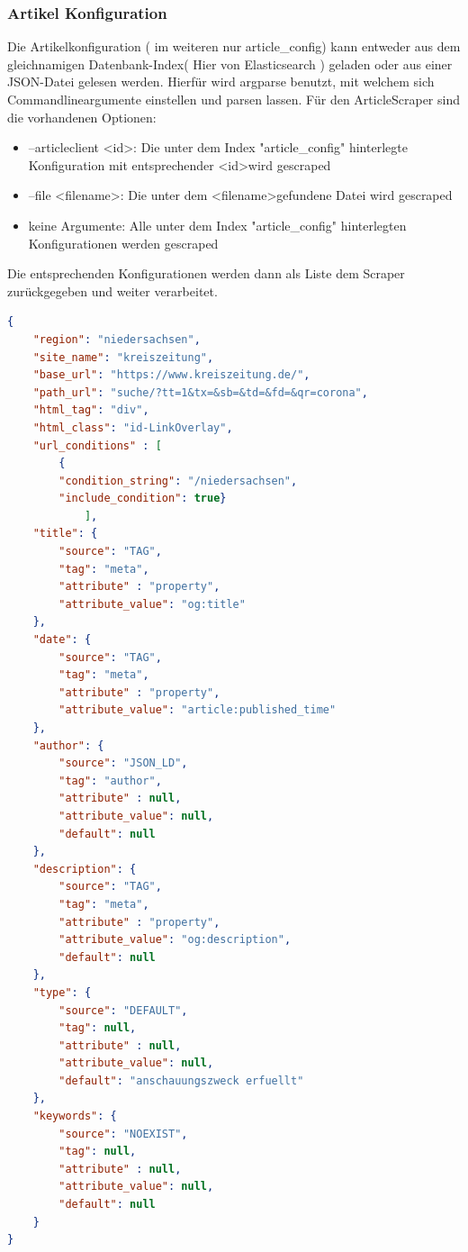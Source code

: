 \documentclass[12pt,oneside,a4paper,parskip]{scrbook}
\begin{document}
\subsubsection{Artikel Konfiguration}
Die Artikelkonfiguration ( im weiteren nur article\_config) kann entweder aus dem gleichnamigen Datenbank-Index( Hier von  Elasticsearch ) geladen oder aus einer JSON-Datei gelesen werden. Hierfür wird argparse benutzt, mit welchem sich Commandlineargumente einstellen und parsen lassen. Für den ArticleScraper sind die vorhandenen Optionen:
\begin{itemize}
\item --articleclient \textless id\textgreater: Die unter dem Index "article\_config" hinterlegte Konfiguration mit entsprechender \textless id\textgreater wird gescraped
\item --file \textless filename\textgreater: Die unter dem \textless filename\textgreater gefundene Datei wird gescraped
\item keine Argumente: Alle unter dem Index "article\_config" hinterlegten Konfigurationen werden gescraped
\end{itemize}
Die entsprechenden Konfigurationen werden dann als Liste dem Scraper zurückgegeben und weiter verarbeitet.
\begin{lstlisting}[caption=article\_config am Beispiel Niedersachsen,label=articleconfig,language=json]
{
    "region": "niedersachsen",
    "site_name": "kreiszeitung",
    "base_url": "https://www.kreiszeitung.de/",
    "path_url": "suche/?tt=1&tx=&sb=&td=&fd=&qr=corona",
    "html_tag": "div",
    "html_class": "id-LinkOverlay",
    "url_conditions" : [
        {
        "condition_string": "/niedersachsen",
        "include_condition": true}
        	],
    "title": {
        "source": "TAG",
        "tag": "meta",
        "attribute" : "property",
        "attribute_value": "og:title"
    },
    "date": {
        "source": "TAG",
        "tag": "meta",
        "attribute" : "property",
        "attribute_value": "article:published_time"
    },
    "author": {
        "source": "JSON_LD",
        "tag": "author",
        "attribute" : null,
        "attribute_value": null,
        "default": null
    },
    "description": {
        "source": "TAG",
        "tag": "meta",
        "attribute" : "property",
        "attribute_value": "og:description",
        "default": null
    },
    "type": {
        "source": "DEFAULT",
        "tag": null,
        "attribute" : null,
        "attribute_value": null,
        "default": "anschauungszweck erfuellt"
    },
    "keywords": {
        "source": "NOEXIST",
        "tag": null,
        "attribute" : null,
        "attribute_value": null,
        "default": null
    }
}
\end{lstlisting}
\pagebreak
\end{document}

